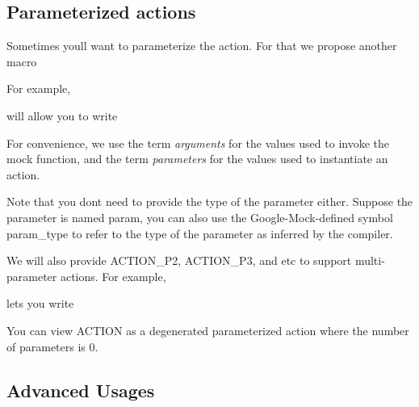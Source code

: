 \subsection*{Parameterized actions}

Sometimes you\textquotesingle{}ll want to parameterize the action. For that we propose another macro 
\begin{DoxyCode}{0}
\end{DoxyCode}


For example, 
\begin{DoxyCode}{0}
\end{DoxyCode}
 will allow you to write 
\begin{DoxyCode}{0}
\end{DoxyCode}


For convenience, we use the term {\itshape arguments} for the values used to invoke the mock function, and the term {\itshape parameters} for the values used to instantiate an action.

Note that you don\textquotesingle{}t need to provide the type of the parameter either. Suppose the parameter is named {\ttfamily param}, you can also use the Google-\/\+Mock-\/defined symbol {\ttfamily param\+\_\+type} to refer to the type of the parameter as inferred by the compiler.

We will also provide {\ttfamily A\+C\+T\+I\+O\+N\+\_\+\+P2}, {\ttfamily A\+C\+T\+I\+O\+N\+\_\+\+P3}, and etc to support multi-\/parameter actions. For example, 
\begin{DoxyCode}{0}
\DoxyCodeLine{\}}
\end{DoxyCode}
 lets you write 
\begin{DoxyCode}{0}
\end{DoxyCode}


You can view {\ttfamily A\+C\+T\+I\+ON} as a degenerated parameterized action where the number of parameters is 0.

\subsection*{Advanced Usages}

